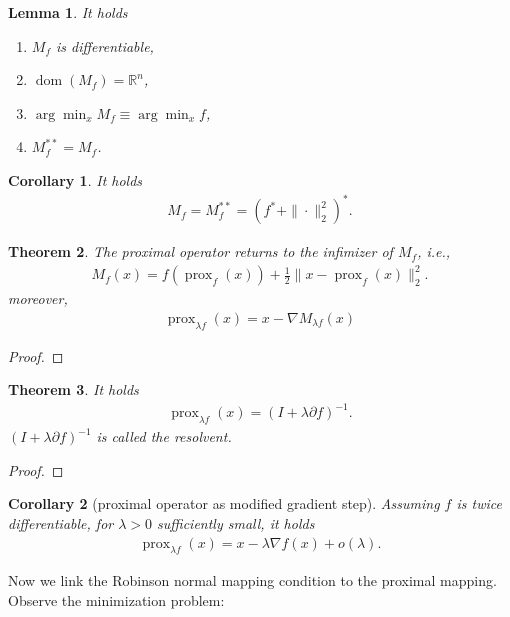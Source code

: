 \documentclass[a4paper,11pt,fleqn, draft]{book}
\newtheorem{theorem}{Theorem}[section]
\newtheorem{corollary}{Corollary}[theorem]
\newtheorem{lemma}[theorem]{Lemma}
\theoremstyle{definition}
\theoremstyle{remark}
\DeclareMathOperator{\dom}{dom}
\DeclareMathOperator*{\prox}{prox}
\begin{document}
\begin{lemma}
	It holds
	\begin{enumerate}
		\item $M_f$ is differentiable, 
		\item $\dom (M_f) = \mathbb{R}^n$, 
		\item $\arg\min_x M_f \equiv \arg\min _x f$,
		\item $M^{**}_f = M_f$.
	\end{enumerate}
\end{lemma}

\begin{corollary}
	It holds
	\begin{align*}
		M_f = M_f^{**} = (f^* + \|\cdot\|_2^2)^*. 
	\end{align*}
\end{corollary}

\begin{theorem}
	The proximal operator returns to the infimizer of $M_f$, i.e., 
	\begin{align*}
		M_f(x) = f(\prox_f(x)) + \frac{1}{2} \| x - \prox_f(x) \|_2^2. 
	\end{align*} 
	moreover, 
	\begin{align*}
		\prox_{\lambda f}(x) = x - \nabla M_{ \lambda f} (x) 
	\end{align*}
\end{theorem}
\begin{proof}
	
\end{proof}

\begin{theorem}
	It holds
	\begin{align*}
		\prox_{\lambda f}(x) = ( I + \lambda \partial f)^{-1}. 
	\end{align*}
	$(I + \lambda \partial f)^{-1}$ is called the resolvent. 
\end{theorem}
\begin{proof}
\end{proof}

\begin{corollary}[proximal operator as modified gradient step]
Assuming $f$ is twice differentiable, for $\lambda > 0$ sufficiently small, it holds
\begin{align*}
	\prox_{\lambda f}(x) = x - \lambda \nabla f (x) + o(\lambda). 
\end{align*}
\end{corollary}

Now we link the Robinson normal mapping condition to the proximal mapping. Observe the minimization problem:
\end{document}
